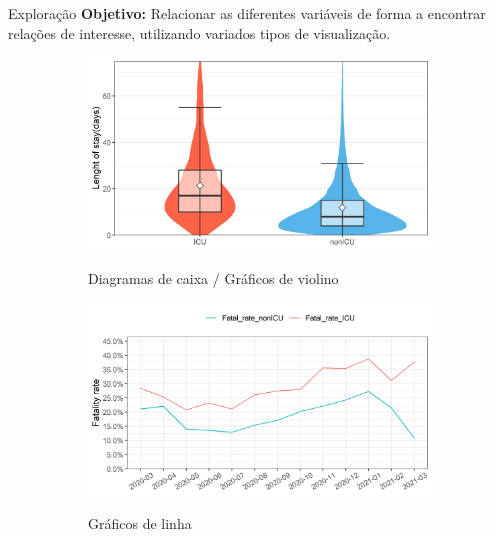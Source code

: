 \documentclass[pdf]
{beamer}
\begin{document}
\begin{frame}{Exploração}
\textbf{Objetivo:} Relacionar as diferentes variáveis de forma a encontrar relações de interesse, utilizando variados tipos de visualização.

\vspace{2cm}

\begin{figure}
	\centering
	\begin{subfigure}[][40pt][b]{0.3\textwidth}
		\caption*{Diagramas de caixa / Gráficos de violino}
		\vspace{-0.4cm}
    		\includegraphics[width=\textwidth]{Imagens/violinBox_Type.jpeg}\\
	\end{subfigure}
	\begin{subfigure}[][40pt][c]{0.3\textwidth}
		\caption*{Gráficos de linha}
		\vspace{-0.4cm}
   		 \includegraphics[width=\textwidth]{Imagens/PopVarPlot_fatalRate.jpeg}\\
	\end{subfigure}
	\begin{subfigure}[][40pt][t]{0.3\textwidth}

\end{subfigure}
\end{figure}
\end{frame}
\end{document}
